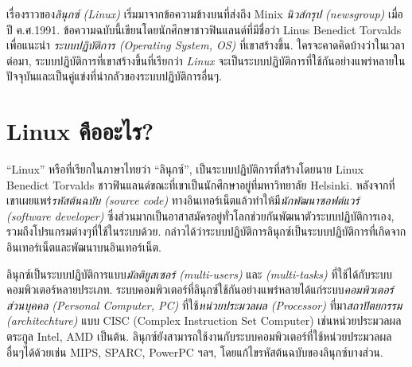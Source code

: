\begin{thwbr}
{%
%
เรื่องราวของ{\em ลินุกซ์ (Linux)} เริ่มมาจากข้อความข้างบนที่ส่งถึง Minix %
%
{\em นิวส์กรุป (newsgroup)} เมื่อปี ค.ศ.1991. ข้อความฉบับนี้เขียนโดยนักศึกษาชาวฟินแลนด์ที่มีชื่อว่า Linus Benedict Torvalds เพื่อแนะนำ {\em ระบบปฏิบัติการ (Operating System,
OS)} ที่เขาสร้างขึ้น. ใครจะคาดคิดบ้างว่าในเวลาต่อมา, ระบบปฏิบัติการที่เขาสร้างขึ้นที่เรียกว่า {\em Linux} จะเป็นระบบปฏิบัติการที่ใช้กันอย่างแพร่หลายในปัจจุบันและเป็นคู่แข่งที่น่ากลัวของระบบปฏิบัติการอื่นๆ. 

 
\section{{\latintext Linux} คืออะไร?}

``Linux'' หรือที่เรียกในภาษาไทยว่า ``ลินุกซ์'',%
เป็นระบบปฏิบัติการที่สร้างโดยนาย Linux Benedict Torvalds ชาวฟินแลนด์ขณะที่เขาเป็นนักศึกษาอยู่ที่มหาวิทยาลัย Helsinki. หลังจากที่เขาเผยแพร่{\em รหัสต้นฉบับ (source code)} ทางอินเทอร์เน็ตแล้วทำให้มี{\em นักพัฒนาซอฟต์แวร์ (software developer)} ซึ่งส่วนมากเป็นอาสาสมัครอยู่ทั่วโลกช่วยกันพัฒนาตัวระบบปฏิบัติการเอง, รวมถึงโปรแกรมต่างๆที่ใช้ในระบบด้วย. กล่าวได้ว่าระบบปฏิบัติการลินุกซ์เป็นระบบปฏิบัติการที่เกิดจากอินเทอร์เน็ตและพัฒนาบนอินเทอร์เน็ต.
 
ลินุกซ์เป็นระบบปฏิบัติการแบบ{\em มัลติยูสเซอร์ (multi-users)} %
และ {\em {} (multi-tasks)} %
%
ที่ใช้ได้กับระบบคอมพิวเตอร์หลายประเภท. ระบบคอมพิวเตอร์ที่ลินุกซ์ใช้กันอย่างแพร่หลายได้แก่ระบบ{\em คอมพิวเตอร์ส่วนบุคคล (Personal Computer, PC)} ที่ใช้{\em หน่วยประมวลผล (Processor)} ที่มา{\em สถาปัตยกรรม (architechture)} แบบ CISC (Complex Instruction Set Computer) เช่นหน่วยประมวลผลตระกูล Intel, AMD เป็นต้น. ลินุกซ์ยังสามารถใช้งานกับระบบคอมพิวเตอร์ที่ใช้หน่วยประมวลผลอื่นๆได้ด้วยเช่น MIPS, SPARC, PowerPC ฯลฯ, โดยแก้ไขรหัสต้นฉบับของลินุกซ์บางส่วน.

}
\end{thwbr}
